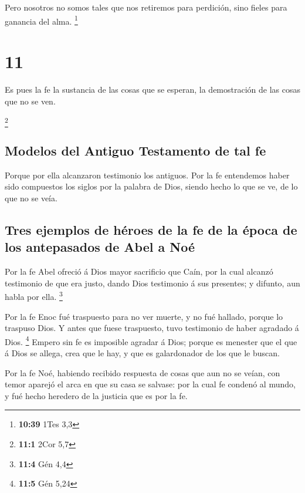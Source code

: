  Pero nosotros no somos tales que nos retiremos para
perdición, sino fieles para ganancia del alma. \footnote{\textbf{10:39}
  1Tes 3,3}

\hypertarget{section-10}{%
\section{11}\label{section-10}}

 Es pues la fe la sustancia de las cosas que se esperan, la
demostración de las cosas que no se ven.

\footnote{\textbf{11:1} 2Cor 5,7}

\hypertarget{modelos-del-antiguo-testamento-de-tal-fe}{%
\subsection{Modelos del Antiguo Testamento de tal
fe}\label{modelos-del-antiguo-testamento-de-tal-fe}}

 Porque por ella alcanzaron testimonio los antiguos.
 Por la fe entendemos haber sido compuestos los siglos por
la palabra de Dios, siendo hecho lo que se ve, de lo que no se veía.

\hypertarget{tres-ejemplos-de-huxe9roes-de-la-fe-de-la-uxe9poca-de-los-antepasados-de-abel-a-nouxe9}{%
\subsection{Tres ejemplos de héroes de la fe de la época de los
antepasados \hspace{0pt}\hspace{0pt}de Abel a
Noé}\label{tres-ejemplos-de-huxe9roes-de-la-fe-de-la-uxe9poca-de-los-antepasados-de-abel-a-nouxe9}}

 Por la fe Abel ofreció á Dios mayor sacrificio que Caín,
por la cual alcanzó testimonio de que era justo, dando Dios testimonio á
sus presentes; y difunto, aun habla por ella. \footnote{\textbf{11:4}
  Gén 4,4}

 Por la fe Enoc fué traspuesto para no ver muerte, y no fué
hallado, porque lo traspuso Dios. Y antes que fuese traspuesto, tuvo
testimonio de haber agradado á Dios. \footnote{\textbf{11:5} Gén 5,24}
 Empero sin fe es imposible agradar á Dios; porque es
menester que el que á Dios se allega, crea que le hay, y que es
galardonador de los que le buscan.

 Por la fe Noé, habiendo recibido respuesta de cosas que aun
no se veían, con temor aparejó el arca en que su casa se salvase: por la
cual fe condenó al mundo, y fué hecho heredero de la justicia que es por
la fe.

